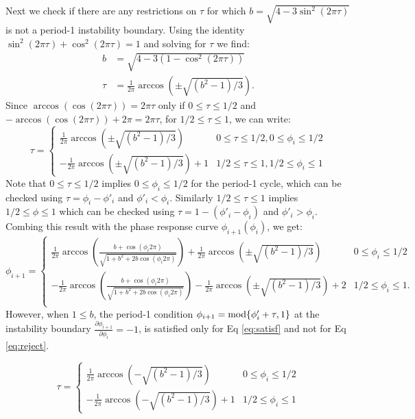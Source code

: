 Next we check if there are any restrictions on $\tau$ for which $b = \sqrt{4-3\sin^2(2\pi\tau)}$ is not a period-1 instability boundary. Using the identity $\sin^2(2\pi\tau) + \cos^2(2\pi\tau) = 1$ and solving for $\tau$ we find:
\begin{align}
    b &= \sqrt{4-3(1-\cos^2(2\pi\tau))}\\
    \tau &= \frac{1}{2\pi}\arccos(\pm\sqrt{(b^2 - 1)/3}).
\end{align}
Since $\arccos(\cos(2\pi \tau)) = 2\pi \tau$ only if $0 \leq \tau \leq 1/2$ and $-\arccos(\cos(2\pi \tau)) +2\pi= 2\pi \tau$, for $1/2 \leq \tau \leq 1$, we can write:
\begin{equation} 
\tau =
\begin{cases}
        \frac{1}{2\pi}\arccos(\pm\sqrt{(b^2 - 1)/3}) & 0 \leq \tau \leq 1/2, 0 \leq \phi_i \leq 1/2 \\
       -\frac{1}{2\pi}\arccos(\pm\sqrt{(b^2 - 1)/3}) + 1 & 1/2 \leq \tau \leq 1, 1/2 \leq \phi_i \leq 1
    \end{cases}
\end{equation}
Note that $0 \leq \tau \leq 1/2$ implies $0 \leq \phi_i \leq 1/2$ for the period-1 cycle, which can be checked using $\tau = \phi_i - \phi'_i$ and $\phi'_i<\phi_i$. Similarly $1/2 \leq \tau \leq 1$ implies $1/2 \leq \phi \leq 1$ which can be checked using $\tau = 1-(\phi'_i - \phi_i)$ and $\phi'_i>\phi_i$.\\

\noindent Combing this result with the phase response curve $\phi_{i+1}(\phi_i)$, we get:
\begin{equation} \phi_{i+1} =
\begin{cases}
        \frac{1}{2\pi}\arccos(\frac{b+\cos(\phi_i 2\pi)}{\sqrt{1+b^2+2b\cos(\phi_i 2\pi)}}) + \frac{1}{2\pi}\arccos(\pm\sqrt{(b^2 - 1)/3}) & 0 \leq \phi_i \leq 1/2 \\
       -\frac{1}{2\pi}\arccos(\frac{b+\cos(\phi_i 2\pi)}{\sqrt{1+b^2+2b\cos(\phi_i 2\pi)}}) -\frac{1}{2\pi}\arccos(\pm\sqrt{(b^2 - 1)/3}) + 2& 1/2 \leq \phi_i \leq 1. \\
    \end{cases}
\end{equation}
However, when $1\leq b$, the period-1 condition $\phi_{i+1} = \textnormal{mod} \{\phi'_i + \tau,1\}$ at the instability boundary $\frac{\partial \phi_{i+1}}{\partial \phi_i} = -1$, is satisfied only for Eq \ref{eq:satisf} and not for Eq \ref{eq:reject}.

\begin{equation} 
    \tau =
    \begin{cases}
        \frac{1}{2\pi}\arccos(-\sqrt{(b^2 - 1)/3}) & 0 \leq \phi_i \leq 1/2 \\
       -\frac{1}{2\pi}\arccos(-\sqrt{(b^2 - 1)/3}) + 1 & 1/2 \leq \phi_i \leq 1
    \end{cases}
    \label{eq:satisf}
\end{equation} 

